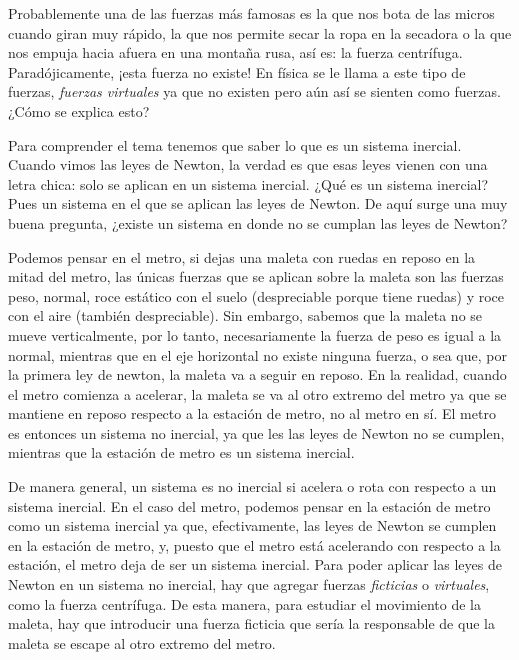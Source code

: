 \documentclass[letterpaper]{article}
\begin{document}
Probablemente una de las fuerzas más famosas es la que nos bota de las micros cuando giran muy rápido, la que nos permite secar la ropa en la secadora o la que nos empuja hacia afuera en una montaña rusa, así es: la fuerza centrífuga. Paradójicamente, ¡esta fuerza no existe! En física se le llama a este tipo de fuerzas, \emph{fuerzas virtuales} ya que no existen pero aún así se sienten como fuerzas. ¿Cómo se explica esto?


Para comprender el tema tenemos que saber lo que es un sistema inercial. Cuando vimos las leyes de Newton, la verdad es que esas leyes vienen con una letra chica: solo se aplican en un sistema inercial. ¿Qué es un sistema inercial? Pues un sistema en el que se aplican las leyes de Newton. De aquí surge una muy buena pregunta, ¿existe un sistema en donde no se cumplan las leyes de Newton? 

Podemos pensar en el metro, si dejas una maleta con ruedas en reposo en la mitad del metro, las únicas fuerzas que se aplican sobre la maleta son las fuerzas peso, normal, roce estático con el suelo (despreciable porque tiene ruedas) y roce con el aire (también despreciable). Sin embargo, sabemos que la maleta no se mueve verticalmente, por lo tanto, necesariamente la fuerza de peso es igual a la normal, mientras que en el eje horizontal no existe ninguna fuerza, o sea que, por la primera ley de newton, la maleta va a seguir en reposo. En la realidad, cuando el metro comienza a acelerar, la maleta se va al otro extremo del metro ya que se mantiene en reposo respecto a la estación de metro, no al metro en sí. El metro es entonces un sistema no inercial, ya que les las leyes de Newton no se cumplen, mientras que la estación de metro es un sistema inercial.

De manera general, un sistema es no inercial si acelera o rota con respecto a un sistema inercial. En el caso del metro, podemos pensar en la estación de metro como un sistema inercial ya que, efectivamente, las leyes de Newton se cumplen en la estación de metro, y, puesto que el metro está acelerando con respecto a la estación, el metro deja de ser un sistema inercial. Para poder aplicar las leyes de Newton en un sistema no inercial, hay que agregar fuerzas \emph{ficticias} o \emph{virtuales}, como la fuerza centrífuga. De esta manera, para estudiar el movimiento de la maleta, hay que introducir una fuerza ficticia que sería la responsable de que la maleta se escape al otro extremo del metro.                   

                                                                                                                                  
\end{document}

